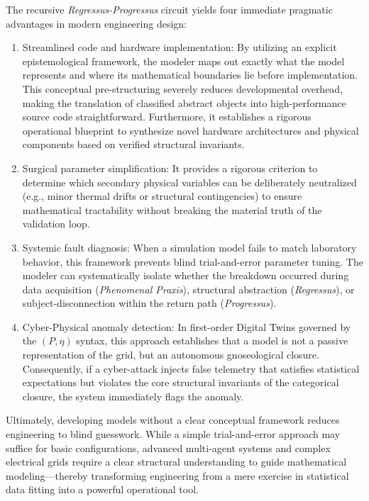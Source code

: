 \documentclass[11pt, a4paper]{article}
\begin{document}
The recursive \textit{Regressus-Progressus} circuit yields four immediate pragmatic advantages in modern engineering design:
\begin{enumerate}
    \item {Streamlined code and hardware implementation:} By utilizing an explicit epistemological framework, the modeler maps out exactly what the model represents and where its mathematical boundaries lie before implementation. This conceptual pre-structuring severely reduces developmental overhead, making the translation of classified abstract objects into high-performance source code straightforward. Furthermore, it establishes a rigorous operational blueprint to synthesize novel hardware architectures and physical components based on verified structural invariants.
    \item {Surgical parameter simplification:} It provides a rigorous criterion to determine which secondary physical variables can be deliberately neutralized (e.g., minor thermal drifts or structural contingencies) to ensure mathematical tractability without breaking the material truth of the validation loop.
    \item {Systemic fault diagnosis:} When a simulation model fails to match laboratory behavior, this framework prevents blind trial-and-error parameter tuning. The modeler can systematically isolate whether the breakdown occurred during data acquisition (\textit{Phenomenal Praxis}), structural abstraction (\textit{Regressus}), or subject-disconnection within the return path (\textit{Progressus}).
    \item {Cyber-Physical anomaly detection:} In first-order Digital Twins governed by the $(P, \eta)$ syntax, this approach establishes that a model is not a passive representation of the grid, but an autonomous gnoseological closure. Consequently, if a cyber-attack injects false telemetry that satisfies statistical expectations but violates the core structural invariants of the categorical closure, the system immediately flags the anomaly.
\end{enumerate}


%
Ultimately, developing models without a clear conceptual framework reduces engineering to blind guesswork. While a simple trial-and-error approach may suffice for basic configurations, advanced multi-agent systems and complex electrical grids require a clear structural understanding to guide mathematical modeling---thereby transforming engineering from a mere exercise in statistical data fitting into a powerful operational tool.
\end{document}
